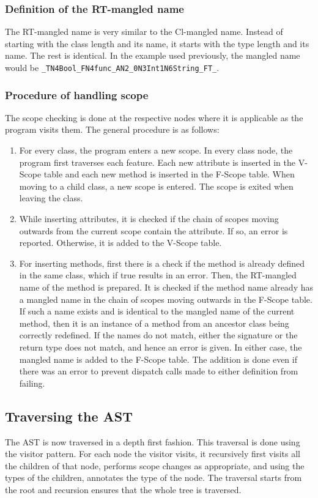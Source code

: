 \documentclass{article}
\begin{document}
\subsubsection*{Definition of the RT-mangled name}
The RT-mangled name is very similar to the Cl-mangled name. Instead of starting with the class length and its name, it starts with the type length and its name. The rest is identical. In the example used previously, the mangled name would be \verb|_TN4Bool_FN4func_AN2_0N3Int1N6String_FT_|.

\subsubsection*{Procedure of handling scope}
The scope checking is done at the respective nodes where it is applicable as the program visits them. The general procedure is as follows:
\begin{enumerate}
	\item For every class, the program enters a new scope. In every class node, the program first traverses each feature. Each new attribute is inserted in the V-Scope table and each new method is inserted in the F-Scope table. When moving to a child class, a new scope is entered. The scope is exited when leaving the class.
	\item While inserting attributes, it is checked if the chain of scopes moving outwards from the current scope contain the attribute. If so, an error is reported. Otherwise, it is added to the V-Scope table.
	\item For inserting methods, first there is a check if the method is already defined in the same class, which if true results in an error. Then, the RT-mangled name of the method is prepared. It is checked if the method name already has a mangled name in the chain of scopes moving outwards in the F-Scope table. If such a name exists and is identical to the mangled name of the current method, then it is an instance of a method from an ancestor class being correctly redefined. If the names do not match, either the signature or the return type does not match, and hence an error is given. In either case, the mangled name is added to the F-Scope table. The addition is done even if there was an error to prevent dispatch calls made to either definition from failing.
\end{enumerate}

\subsection{Traversing the AST}
The AST is now traversed in a depth first fashion. This traversal is done using the visitor pattern. For each node the visitor visits, it recursively first visits all the children of that node, performs scope changes as appropriate, and using the types of the children, annotates the type of the node. The traversal starts from the root and recursion ensures that the whole tree is traversed.
\end{document}
